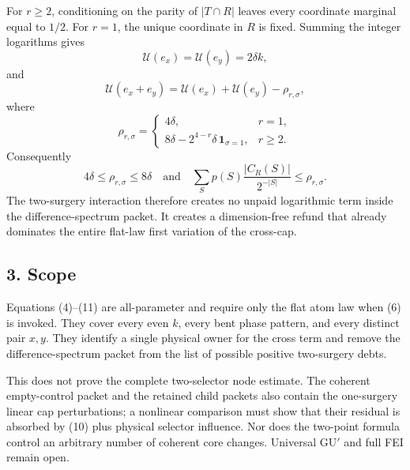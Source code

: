 For $r\ge2$, conditioning on the parity of $|T\cap R|$ leaves every
coordinate marginal equal to $1/2$.  For $r=1$, the unique coordinate in
$R$ is fixed.  Summing the integer logarithms gives
\[
 \mathcal U(e_x)=\mathcal U(e_y)=2\delta k,
\tag{8}
\]
and
\[
 \boxed{
 \mathcal U(e_x+e_y)=\mathcal U(e_x)+\mathcal U(e_y)-\rho_{r,\sigma},}
\tag{9}
\]
where
\[
 \rho_{r,\sigma}=
 \begin{cases}
 4\delta,&r=1,\\
 8\delta-2^{4-r}\delta\,\mathbf1_{\sigma=1},&r\ge2.
 \end{cases}
\tag{10}
\]
Consequently
\[
 4\delta\le\rho_{r,\sigma}\le8\delta
 \quad\text{and}\quad
 \sum_Sp(S)\frac{|C_R(S)|}{2^{-|S|}}
 \le\rho_{r,\sigma}.
\tag{11}
\]
The two-surgery interaction therefore creates no unpaid logarithmic term
inside the difference-spectrum packet.  It creates a dimension-free refund
that already dominates the entire flat-law first variation of the
cross-cap.

\subsection*{3. Scope}

Equations (4)--(11) are all-parameter and require only the flat atom law
when (6) is invoked.  They cover every even $k$, every bent phase pattern,
and every distinct pair $x,y$.  They identify a single physical owner for
the cross term and remove the difference-spectrum packet from the list of
possible positive two-surgery debts.

This does not prove the complete two-selector node estimate.  The coherent
empty-control packet and the retained child packets also contain the
one-surgery linear cap perturbations; a nonlinear comparison must show that
their residual is absorbed by (10) plus physical selector influence.  Nor
does the two-point formula control an arbitrary number of coherent core
changes.  Universal GU$'$ and full FEI remain open.
